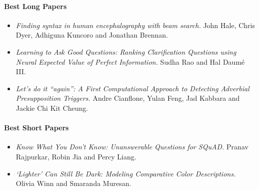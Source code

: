 \paragraph{Best Long Papers}

\begin{itemize}
\item \textit{Finding syntax in human encephalography with beam search.} John Hale, Chris Dyer, Adhiguna Kuncoro and Jonathan Brennan.
\item \textit{Learning to Ask Good Questions: Ranking Clarification Questions using Neural Expected Value of Perfect Information.} Sudha Rao and Hal Daumé III.
\item \textit{Let’s do it “again”: A First Computational Approach to Detecting Adverbial Presupposition Triggers.} Andre Cianflone, Yulan Feng, Jad Kabbara and Jackie Chi Kit Cheung.
\end{itemize}

\paragraph{Best Short Papers}

\begin{itemize}
\item \textit{Know What You Don’t Know: Unanswerable Questions for SQuAD.} Pranav Rajpurkar, Robin Jia and Percy Liang.
\item \textit{‘Lighter’ Can Still Be Dark: Modeling Comparative Color Descriptions.} Olivia Winn and Smaranda Muresan.
\end{itemize}
